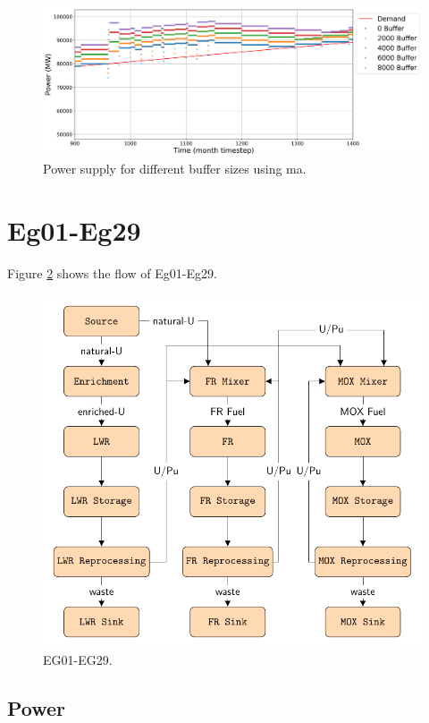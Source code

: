\documentclass[11pt]{article}
\begin{document}
\begin{figure}[H]
	\centering
	\includegraphics[width=\textwidth]{24-figures/24-power-buffer-fft.png} 
	\hfill
	\caption{Power supply for different buffer sizes using ma.}
	\label{fig:24-buf-fft}
\end{figure}

\section{Eg01-Eg29}

Figure \ref{fig:29flow} shows the flow of Eg01-Eg29.

\begin{figure}[H]
	\centering
	\includegraphics[width=\textwidth]{29-figures/29flow.pdf} 
	\hfill
	\caption{EG01-EG29.}
	\label{fig:29flow}
\end{figure}

\subsection{Power}
\end{document}
